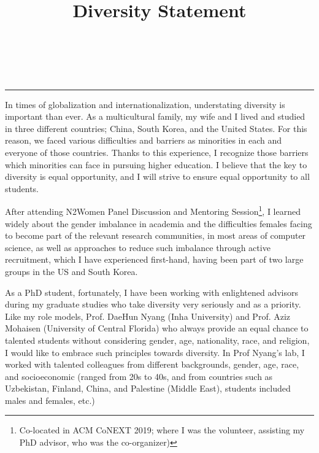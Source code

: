 \documentclass{NSF}
\begin{document}
\title{Diversity Statement}\\
\\\rule{\textwidth}{1.5pt}\vspace{3mm}
\thispagestyle{empty}


In times of globalization and internationalization, understating diversity is important than ever.  
As a multicultural family, my wife and I lived and studied in three different countries; China, South Korea, and the United States. For this reason, we faced various difficulties and barriers as minorities in each and everyone of those countries. Thanks to this experience, I recognize those barriers which minorities can face in pursuing higher education. I believe that the key to diversity is equal opportunity, and I will strive to ensure equal opportunity to all students.  

After attending N2Women Panel Discussion and Mentoring Session\footnote{Co-located in ACM CoNEXT 2019; where I was the volunteer, assisting my PhD advisor, who was the co-organizer)}, I learned widely about the gender imbalance in academia and the difficulties females facing to become part of the relevant research communities, in most areas of computer science, as well as approaches to reduce such imbalance through active recruitment, which I have experienced first-hand, having been part of two large groups in the US and South Korea.

As a PhD student, fortunately, I have been working with enlightened advisors during my graduate studies who take diversity very seriously and as a priority. Like my role models, Prof. DaeHun Nyang (Inha University) and Prof. Aziz Mohaisen (University of Central Florida) who always provide an equal chance to talented students without considering gender, age, nationality, race, and religion, I would like to embrace such principles towards diversity. In Prof Nyang's lab, I worked with talented colleagues  from different backgrounds, gender, age, race, and socioeconomic (ranged from 20s to 40s, and from countries such as Uzbekistan, Finland, China, and Palestine (Middle East), students included males and females, etc.) 
\end{document}
